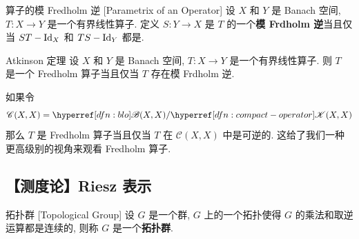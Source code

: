         \begin{dfn}
            {算子的模 Fredholm 逆}
            [Parametrix of an Operator]
            设 \(X\) 和 \(Y\) 是 Banach 空间, \(T:X\to Y\) 是一个有界线性算子. 定义 \(S:Y\to X\) 是 \(T\) 的一个\textbf{模 Frdholm 逆}当且仅当 \(ST-\operatorname{Id}_X\) 和 \(TS-\operatorname{Id}_Y\) 都是\CompactOp{}.
        \end{dfn}

        \begin{thm}
            {Atkinson 定理}
            设 \(X\) 和 \(Y\) 是 Banach 空间, \(T:X\to Y\) 是一个有界线性算子. 则 \(T\) 是一个 Fredholm 算子当且仅当 \(T\) 存在模 Frdholm 逆.
        \end{thm}

        \begin{rmk}
            [Dedicatia]
            如果令
            \[\mathscr{C}(X,X)=\blo(X,X) / \cpt(X,X)\]
            那么 \(T\) 是 Fredholm 算子当且仅当 \(T\) 在 \(\mathscr{C}(X,X)\) 中是可逆的. 这给了我们一种更高级别的视角来观看 Fredholm 算子.
        \end{rmk}

    \subsection{【测度论】Riesz 表示}

        \begin{dfn}
            {拓扑群}
            [Topological Group]
            设 \(G\) 是一个群, \(G\) 上的一个拓扑使得 \(G\) 的乘法和取逆运算都是连续的, 则称 \(G\) 是一个\textbf{拓扑群}.
        \end{dfn}

